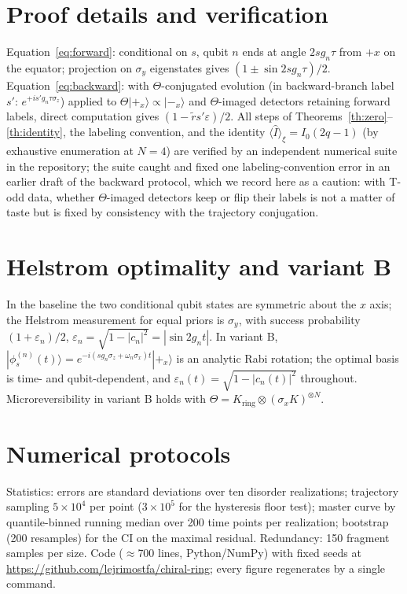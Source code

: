 \documentclass[11pt]{article}
\newcommand{\Iop}{\hat{I}}
\begin{document}
\section{Proof details and verification}\label{app:proofs}
Equation~\eqref{eq:forward}: conditional on $s$, qubit $n$ ends at angle $2sg_n\tau$ from $+x$ on the equator; projection on $\sigma_y$ eigenstates gives $(1\pm\sin 2sg_n\tau)/2$. Equation~\eqref{eq:backward}: with $\Theta$-conjugated evolution (in backward-branch label $s'$: $e^{+is'g_n\tau\sigma_z}$) applied to $\Theta|+_x\rangle\propto|-_x\rangle$ and $\Theta$-imaged detectors retaining forward labels, direct computation gives $(1-\tilde r s'\varepsilon)/2$. All steps of Theorems~\ref{th:zero}--\ref{th:identity}, the labeling convention, and the identity $\langle\Iop\rangle_\xi=I_0(2q-1)$ (by exhaustive enumeration at $N=4$) are verified by an independent numerical suite in the repository; the suite caught and fixed one labeling-convention error in an earlier draft of the backward protocol, which we record here as a caution: with T-odd data, whether $\Theta$-imaged detectors keep or flip their labels is not a matter of taste but is fixed by consistency with the trajectory conjugation.

\section{Helstrom optimality and variant B}\label{app:helstrom}
In the baseline the two conditional qubit states are symmetric about the $x$ axis; the Helstrom measurement for equal priors is $\sigma_y$, with success probability $(1+\varepsilon_n)/2$, $\varepsilon_n=\sqrt{1-|c_n|^2}=|\sin 2g_nt|$. In variant B, $|\phi_s^{(n)}(t)\rangle = e^{-i(sg_n\sigma_z+\omega_n\sigma_x)t}|+_x\rangle$ is an analytic Rabi rotation; the optimal basis is time- and qubit-dependent, and $\varepsilon_n(t)=\sqrt{1-|c_n(t)|^2}$ throughout. Microreversibility in variant B holds with $\Theta=K_{\mathrm{ring}}\otimes(\sigma_xK)^{\otimes N}$.

\section{Numerical protocols}\label{app:numerics}
Statistics: errors are standard deviations over ten disorder realizations; trajectory sampling $5\times10^4$ per point ($3\times10^5$ for the hysteresis floor test); master curve by quantile-binned running median over 200 time points per realization; bootstrap (200 resamples) for the CI on the maximal residual. Redundancy: 150 fragment samples per size. Code ($\approx$700 lines, Python/NumPy) with fixed seeds at \url{https://github.com/lejrimostfa/chiral-ring}; every figure regenerates by a single command.
\end{document}
